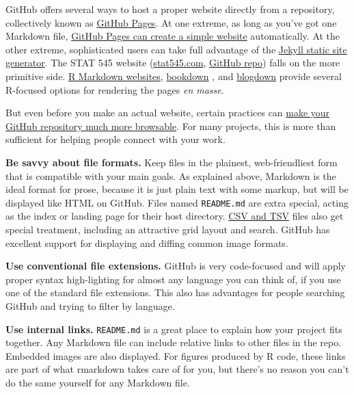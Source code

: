 \documentclass[12pt]{article}
\begin{document}
GitHub offers several ways to host a proper website directly from a
repository, collectively known as
\href{https://help.github.com/categories/github-pages-basics/}{GitHub
Pages}. At one extreme, as long as you've got one Markdown file,
\href{https://github.com/blog/2289-publishing-with-github-pages-now-as-easy-as-1-2-3}{GitHub
Pages can create a simple website} automatically. At the other extreme,
sophisticated users can take full advantage of the
\href{https://jekyllrb.com}{Jekyll static site generator}. The STAT 545
website (\href{http://stat545.com}{stat545.com},
\href{https://github.com/STAT545-UBC/STAT545-UBC.github.io}{GitHub
repo}) falls on the more primitive side.
\href{http://rmarkdown.rstudio.com/rmarkdown_websites.html}{R Markdown
websites}, \href{https://bookdown.org}{bookdown}
\citep{bookdown-pkg, bookdown-book}, and
\href{https://bookdown.org/yihui/blogdown/}{blogdown} provide several
R-focused options for rendering the pages \emph{en masse}.

But even before you make an actual website, certain practices can
\href{http://happygitwithr.com/repo-browsability.html}{make your GitHub
repository much more browsable}. For many projects, this is more than
sufficient for helping people connect with your work.

\textbf{Be savvy about file formats.} Keep files in the plainest,
web-friendliest form that is compatible with your main goals. As
explained above, Markdown is the ideal format for prose, because it is
just plain text with some markup, but will be displayed like HTML on
GitHub. Files named \texttt{README.md} are extra special, acting as the
index or landing page for their host directory.
\href{https://help.github.com/articles/rendering-csv-and-tsv-data/}{CSV
and TSV} files also get special treatment, including an attractive grid
layout and search. GitHub has excellent support for displaying and
diffing common image formats.

\textbf{Use conventional file extensions.} GitHub is very code-focused
and will apply proper syntax high-lighting for almost any language you
can think of, if you use one of the standard file extensions. This also
has advantages for people searching GitHub and trying to filter by
language.

\textbf{Use internal links.} \texttt{README.md} is a great place to
explain how your project fits together. Any Markdown file can include
relative links to other files in the repo. Embedded images are also
displayed. For figures produced by R code, these links are part of what
rmarkdown takes care of for you, but there's no reason you can't do the
same yourself for any Markdown file.
\end{document}
